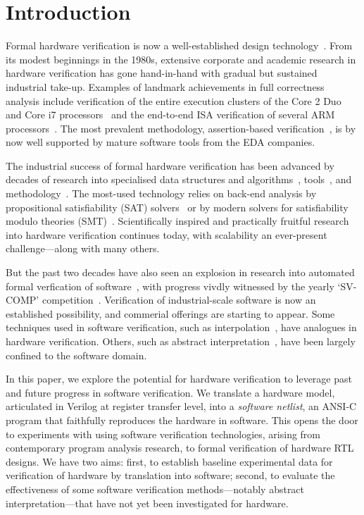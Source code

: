 \section{Introduction}\label{sec:intro}
%
Formal hardware verification is now a well-established design technology~\cite{Seligman:2015:FV}. From its modest beginnings in the 1980s, extensive corporate and academic research in hardware verification has gone hand-in-hand with gradual but sustained industrial take-up. Examples of landmark achievements in full correctness analysis include verification of the entire execution clusters of the Core 2 Duo~\cite{Core2}  and Core i7 processors~\cite{i7} and the end-to-end ISA verification of several ARM processors~\cite{ARM}. The most prevalent methodology, assertion-based verification~\cite{Foster:2009:AAB}, is by now well supported by mature software tools from the EDA companies.

The industrial success of formal hardware verification has been advanced by decades of research into specialised data structures and algorithms~\cite{vis}, tools~\cite{Seger:2005:IEE,abc}, and methodology~\cite{MCMILLAN2000279,Aagaard:2000:MLH}.  The most-used technology relies on back-end analysis by propositional satisfiability (SAT) solvers~\cite{Biere1999} or by modern solvers for satisfiability modulo theories (SMT)~\cite{decision_procedures, DBLP:conf/lpar/AndrausLS08,soc-keating,
DBLP:conf/mtv/SunkariCVM07,DBLP:conf/cav/Bjesse08}. Scientifically inspired and practically fruitful research into hardware verification continues today, with scalability an ever-present challenge---along with many others. 

But the past two decades have also seen an explosion in research into automated formal verfication of software~\cite{dkw2008}, with progress vivdly witnessed by the yearly `SV-COMP' competition~\cite{Beyer2017}.  Verification of industrial-scale software is now an established possibility, and commerial offerings are starting to appear. Some techniques used in software verification, such as interpolation~\cite{Interpolants,Kroening:2011:ISV}, have analogues in hardware verification. Others, such as abstract interpretation~\cite{CousotCousot77,Cousot:1996:AI}, have been largely confined to the software domain.  

In this paper, we explore the potential for hardware verification to leverage past and future progress in software verification. We translate a hardware model, articulated in Verilog at register transfer level, into a \emph{software netlist}, an ANSI-C program that faithfully reproduces the hardware in software. This opens the door to experiments with using software verification technologies, arising from contemporary program analysis research, to formal verification of hardware RTL designs. We have two aims: first, to establish baseline experimental data for verification of hardware by translation into software; second, to evaluate the effectiveness of some software verification methods---notably abstract interpretation---that have not yet been investigated for hardware.

